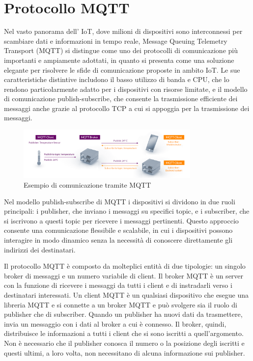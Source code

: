 \documentclass[12pt,a4paper,openright,twoside]{book}
\begin{document}
\section{Protocollo MQTT}

Nel vasto panorama dell' \ac{IoT}, dove milioni di dispositivi sono interconnessi per scambiare dati e informazioni in tempo reale, Message Queuing Telemetry Transport (MQTT) 
si distingue come uno dei protocolli di comunicazione più importanti e ampiamente adottati, in quanto si presenta come una soluzione elegante per risolvere le sfide di 
comunicazione proposte in ambito \ac*{IoT}. Le sue caratteristiche distintive includono il basso utilizzo di banda e CPU, che lo rendono particolarmente adatto per i 
dispositivi con risorse limitate, e il modello di comunicazione publish-subscribe, che consente la trasmissione efficiente dei messaggi anche grazie al protocollo 
\ac{TCP} a cui si appoggia per la trasmissione dei messaggi.

\begin{figure}[H]
    \centering
    \includegraphics[width=0.8\textwidth]{figures/mqtt-example.png}
    \caption{Esempio di comunicazione tramite MQTT}
    \label{fig:mqtt-example}
\end{figure}

Nel modello publish-subscribe di \ac{MQTT} i dispositivi si dividono in due ruoli principali:
 i publisher, che inviano i messaggi su specifici topic, e i subscriber, che si iscrivono a questi topic per ricevere i messaggi pertinenti. 
 Questo approccio consente una comunicazione flessibile e scalabile, in cui i dispositivi possono interagire in modo dinamico senza la necessità
 di conoscere direttamente gli indirizzi dei destinatari.

Il protocollo \ac{MQTT} è composto da molteplici entità di due tipologie: un singolo broker di messaggi e un numero variabile di client. Il broker \ac{MQTT} è un server 
con la funzione di ricevere i messaggi da tutti i client e di instradarli verso i destinatari interessati. Un client MQTT è un qualsiasi dispositivo che esegue una libreria 
\ac{MQTT} e si connette a un broker \ac{MQTT} e può svolgere sia il ruolo di publisher che di subscriber. Quando un publisher ha nuovi dati da trasmettere, 
invia un messaggio con i dati al broker a cui è connesso. Il broker, quindi, distribuisce le informazioni a tutti i client che si sono iscritti a quell’argomento. 
Non è necessario che il publisher conosca il numero o la posizione degli iscritti e questi ultimi, a loro volta, non necessitano di alcuna informazione sui publisher.
\end{document}
